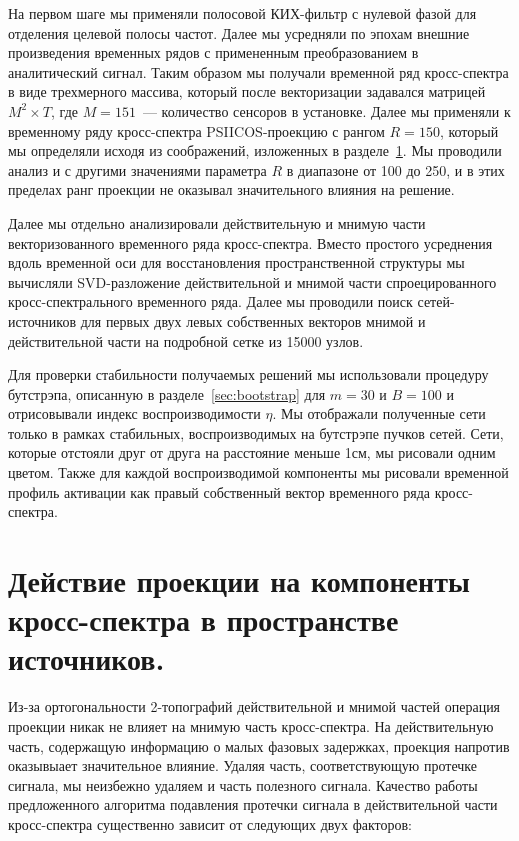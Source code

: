 На первом шаге мы применяли полосовой КИХ-фильтр с нулевой фазой для отделения
целевой полосы частот. Далее мы усредняли по эпохам внешние произведения
временных рядов с примененным преобразованием в аналитический сигнал. Таким
образом мы получали временной ряд кросс-спектра в виде трехмерного массива,
который после векторизации задавался матрицей $M^2 \times T$, где $M=151$~---
количество сенсоров в установке. Далее мы применяли к временному ряду
кросс-спектра PSIICOS-проекцию с рангом $R=150$, который мы определяли исходя
из соображений, изложенных в разделе~\ref{sec:subspaces_attenuation}. Мы
проводили анализ и с другими значениями параметра $R$ в диапазоне от 100 до
250, и в этих пределах ранг проекции не оказывал значительного влияния на
решение.

Далее мы отдельно анализировали действительную и мнимую части векторизованного
временного ряда кросс-спектра. Вместо простого усреднения вдоль временной оси
для восстановления пространственной структуры мы вычисляли SVD-разложение
действительной и мнимой части спроецированного кросс-спектрального временного
ряда. Далее мы проводили поиск сетей-источников для первых двух левых
собственных векторов мнимой и действительной части на подробной сетке из 15000
узлов.

Для проверки стабильности получаемых решений мы использовали процедуру
бутстрэпа, описанную в разделе~\ref{sec:bootstrap} для $m=30$ и $B=100$ и
отрисовывали индекс воспроизводимости $\eta$.  Мы отображали полученные сети
только в рамках стабильных, воспроизводимых на бутстрэпе пучков сетей. Сети,
которые отстояли друг от друга на расстояние меньше 1см, мы рисовали одним
цветом.  Также для каждой воспроизводимой компоненты мы рисовали временной
профиль активации как правый собственный вектор временного ряда кросс-спектра.


\section{Действие проекции на компоненты кросс-спектра в пространстве источников.}\label{sec:subspaces_attenuation}

Из-за ортогональности 2-топографий действительной и мнимой частей операция
проекции никак не влияет на мнимую часть кросс-спектра. На действительную
часть, содержащую информацию о малых фазовых задержках, проекция напротив
оказывыает значительное влияние.  Удаляя часть, соответствующую протечке
сигнала, мы неизбежно удаляем и часть полезного сигнала. Качество работы
предложенного алгоритма подавления протечки сигнала в действительной части
кросс-спектра существенно зависит от следующих двух факторов:

